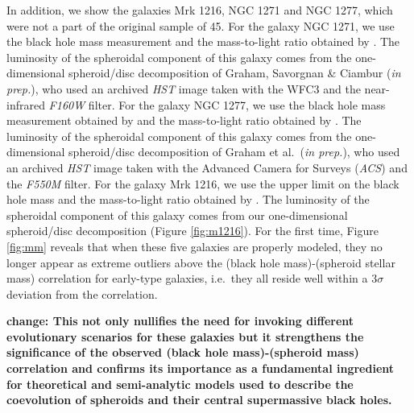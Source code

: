 \documentclass[useAMS,usenatbib,article]{mn2e}
\begin{document}
In addition, we show the galaxies Mrk 1216, NGC 1271 and NGC 1277, which were not a part of the original sample of 45.
For the galaxy NGC 1271, we use the black hole mass measurement and the mass-to-light ratio obtained by \cite{walsh2015}. 
The luminosity of the spheroidal component of this galaxy comes from the one-dimensional spheroid/disc decomposition 
of Graham, Savorgnan \& Ciambur (\emph{in prep.}),  
who used an archived \emph{HST} image taken with the WFC3 and the near-infrared \emph{F160W} filter. 
For the galaxy NGC 1277, we use the black hole mass measurement obtained by \cite{vandenbosch2012} 
and the mass-to-light ratio obtained by \cite{martinnavarro2015}. 
The luminosity of the spheroidal component of this galaxy comes from the one-dimensional spheroid/disc decomposition of Graham et al.~(\emph{in prep.}), 
who used an archived \emph{HST} image taken with the Advanced Camera for Surveys (\emph{ACS}) and the \emph{F550M} filter. 
For the galaxy Mrk 1216, we use the upper limit on the black hole mass and the mass-to-light ratio obtained by \cite{yildirim2015}. 
The luminosity of the spheroidal component of this galaxy comes from our one-dimensional spheroid/disc decomposition (Figure \ref{fig:m1216}).
For the first time, Figure \ref{fig:mm} reveals that when these five galaxies are properly modeled, 
they no longer appear as extreme outliers above the (black hole mass)-(spheroid stellar mass) correlation for early-type galaxies, 
i.e.~they all reside well within a $3\sigma$ deviation from the correlation.

{\bf change: This not only nullifies the need for invoking different evolutionary scenarios for these galaxies 
but it strengthens the significance of the observed (black hole mass)-(spheroid mass) correlation 
and confirms its importance as a fundamental ingredient for theoretical and semi-analytic models 
used to describe the coevolution of spheroids and their central supermassive black holes. }
\end{document}
